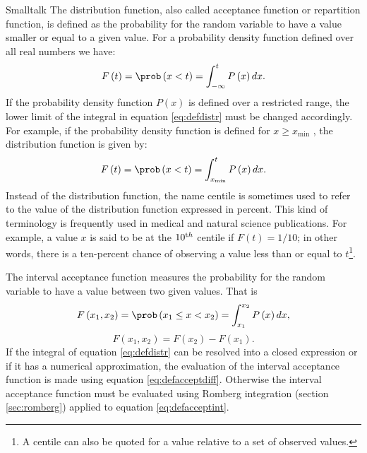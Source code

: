 \begin{displaycode}{Smalltalk}
The distribution function, also called acceptance function or
repartition function, is defined as the probability for the random
variable to have a value smaller or equal to a given value. For a
probability density function defined over all real numbers we
have:
\begin{equation}
\label{eq:defdistr}
  F\left(t\right)=\prob\left(x<t\right)=\int_{-\infty}^t P\left(x\right)
  dx.
\end{equation}
If the probability density function $P\left(x\right)$ is defined
over a restricted range, the lower limit of the integral in
equation \ref{eq:defdistr} must be changed accordingly. For
example, if the probability density function is defined for $x\geq
x_{\min}$ , the distribution function is given by:
\begin{equation}
\label{eq:defdistrmin}
  F\left(t\right)=\prob\left(x<t\right)=\int_{x_{\min}}^t P\left(x\right)
  dx.
\end{equation}
Instead of the distribution function,  the name centile is
sometimes used to refer to the value of the distribution function
expressed in percent. This kind of terminology is frequently used
in medical and natural science publications. For example, a value
$x$ is said to be at the $10^{\mathop{\textrm th}}$ centile if
$F\left(t\right)=1/10$; in other words, there is a ten-percent
chance of observing a value less than or equal to $t$\footnote{A
centile can also be quoted for a value relative to a set of
observed values.}.

The interval acceptance function measures the probability for the
random variable to have a value between two given values. That is
\begin{equation}
\label{eq:defacceptint}
  F\left(x_1,x_2\right)=\prob\left(x_1\le x<x_2\right)
  =\int_{x_1}^{x_2} P\left(x\right)dx,
\end{equation}
\begin{equation}
\label{eq:defacceptdiff}
  F\left(x_1,x_2\right)=F\left(x_2\right)-F\left(x_1\right).
\end{equation}
If the integral of equation \ref{eq:defdistr} can be resolved into
a closed expression or if it has a numerical approximation, the
evaluation of the interval acceptance function is made using
equation \ref{eq:defacceptdiff}. Otherwise the interval acceptance
function must be evaluated using Romberg integration (\cf section
\ref{sec:romberg}) applied to equation \ref{eq:defacceptint}.


\end{displaycode}

